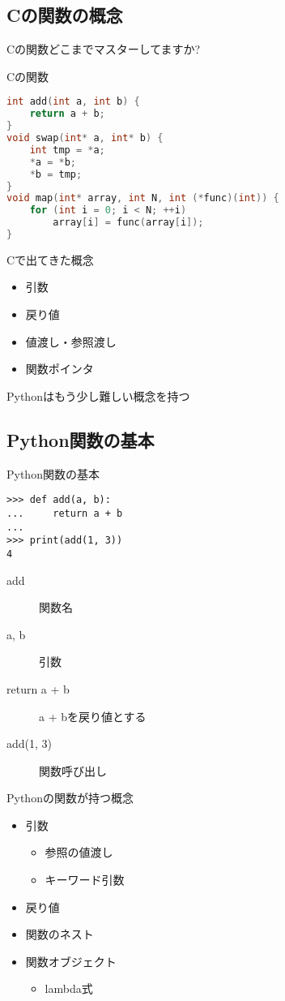 \documentclass[12pt, xetex, xcolor=pdftex, dvipsnames]{beamer}
\begin{document}
\subsection{Cの関数の概念}
\begin{frame}
    \alert{\Large Cの関数どこまでマスターしてますか?}
\end{frame}
\begin{frame}[fragile]{Cの関数}
    \begin{lstlisting}[language={C}]
int add(int a, int b) {
    return a + b;
}
void swap(int* a, int* b) {
    int tmp = *a;
    *a = *b;
    *b = tmp;
}
void map(int* array, int N, int (*func)(int)) {
    for (int i = 0; i < N; ++i)
        array[i] = func(array[i]);
}
    \end{lstlisting}
\end{frame}
\begin{frame}{Cで出てきた概念}
    \begin{itemize}
        \item 引数
        \item 戻り値
        \item 値渡し・参照渡し
        \item 関数ポインタ
    \end{itemize}

    \pause
    Pythonはもう少し難しい概念を持つ
\end{frame}
\subsection{Python関数の基本}
\begin{frame}[fragile]{Python関数の基本}
\begin{lstlisting}
>>> def add(a, b):
...     return a + b
... 
>>> print(add(1, 3))
4
\end{lstlisting}
\pause
\begin{description}
\item[add] 関数名
\item[a, b] 引数
\item[return a + b] a + bを戻り値とする
\item[add(1, 3)] 関数呼び出し
\end{description}
\end{frame}
\begin{frame}{Pythonの関数が持つ概念}
    \begin{itemize}
        \item 引数
        \begin{itemize}
            \item 参照の値渡し
            \item キーワード引数
        \end{itemize}
        \item 戻り値
        \item 関数のネスト
        \item 関数オブジェクト
        \begin{itemize}
            \item lambda式
        \end{itemize}
    \end{itemize}
\end{frame}
\end{document}
